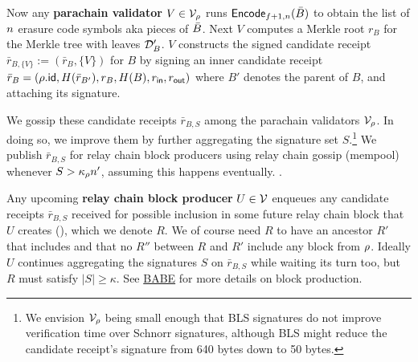 Now any {\bf parachain validator} $V \in \mathcal{V}_{\rho}$ runs $\mathsf{Encode}_{f+1,n}(\bar{B})$ to obtain the list  of $n$ erasure code symbols aka pieces of $\bar{B}$.  Next $V$ computes a Merkle root $r_B$ for the Merkle tree with leaves $\mathcal{D}'_B$.  $V$ constructs the signed candidate receipt $\bar{r}_{B,\{V\}} := (\bar{r}_{B},\{V\})$ for $B$ by signing an inner candidate receipt $\bar{r}_B = (\rho.\mathsf{id},H(\bar{r}_{B'}),r_B,H(B),r_{\mathsf{in}},r_{\mathsf{out}})$ where $B'$ denotes the parent of $B$, and attaching its signature.  

We gossip these candidate receipts $\bar{r}_{B,S}$ among the parachain validators $\mathcal{V}_{\rho}$.  In doing so, we improve them by further aggregating the signature set $S$.\footnote{We envision $\mathcal{V}_{\rho}$ being small enough that BLS signatures do not improve verification time over Schnorr signatures, although BLS might reduce the candidate receipt's signature from 640 bytes down to 50 bytes.}  We publish $\bar{r}_{B,S}$ for relay chain block producers using relay chain gossip (mempool) whenever $S > \kappa_{\rho} n'$, assuming this happens eventually.    .

\smallskip

Any upcoming {\bf relay chain block producer} $U \in \mathcal{V}$ enqueues any candidate receipts $\bar{r}_{B,S}$ received for possible inclusion in some future relay chain block that $U$ creates (), which we denote $R$.  We of course need $R$ to have an ancestor $R'$ that includes  and that no $R''$ between $R$ and $R'$ include any block from $\rho$.  Ideally $U$ continues aggregating the signatures $S$ on $\bar{r}_{B,S}$ while waiting its turn too, but $R$ must satisfy $|S| \ge \kappa$.  See \href{http://research.web3.foundation/en/latest/polkadot/BABE/Babe/}{BABE} for more details on block production.


